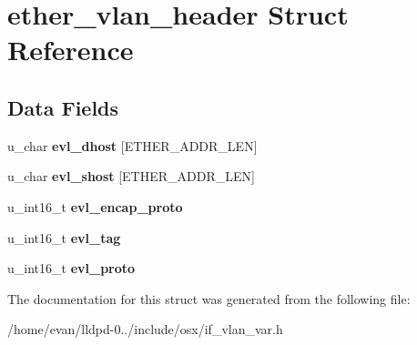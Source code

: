 \section{ether\-\_\-vlan\-\_\-header \-Struct \-Reference}
\label{structether__vlan__header}
\subsection*{\-Data \-Fields}
\begin{DoxyCompactItemize}
\item 
u\-\_\-char {\bfseries evl\-\_\-dhost} [\-E\-T\-H\-E\-R\-\_\-\-A\-D\-D\-R\-\_\-\-L\-E\-N]\label{structether__vlan__header_ad481377f28f15cfa876a6c32cab079d7}

\item 
u\-\_\-char {\bfseries evl\-\_\-shost} [\-E\-T\-H\-E\-R\-\_\-\-A\-D\-D\-R\-\_\-\-L\-E\-N]\label{structether__vlan__header_a04434b8e7b51b4c42100abde7a22d567}

\item 
u\-\_\-int16\-\_\-t {\bfseries evl\-\_\-encap\-\_\-proto}\label{structether__vlan__header_a2d8038b6470206e3f6c6d5fb08b673b7}

\item 
u\-\_\-int16\-\_\-t {\bfseries evl\-\_\-tag}\label{structether__vlan__header_a997c91018e79e8b2437f4b2775156ec7}

\item 
u\-\_\-int16\-\_\-t {\bfseries evl\-\_\-proto}\label{structether__vlan__header_ae7352e4ca53591f2f6d9c37625b76d4d}

\end{DoxyCompactItemize}


\-The documentation for this struct was generated from the following file\-:\begin{DoxyCompactItemize}
\item 
/home/evan/lldpd-\/0../include/osx/if\-\_\-vlan\-\_\-var.\-h\end{DoxyCompactItemize}
